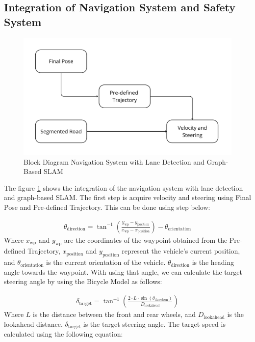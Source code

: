\documentclass[conference]{IEEEtran}
\begin{document}
\subsection{Integration of Navigation System and Safety System}
\begin{figure}[H]
	\centering
	\includegraphics[width=\linewidth]{../konten/nav_sysss.png}
	\caption{Block Diagram Navigation System with Lane Detection and Graph-Based SLAM}
	\label{fig:nav_new_system}
\end{figure} 

The figure \ref{fig:nav_new_system} shows the integration of the navigation system with lane detection and graph-based SLAM. The first step is acquire velocity and steering using Final Pose and Pre-defined Trajectory. This can be done using step below: 

\begin{equation}
	\begin{aligned}
	\theta_{\text{direction}} = \tan^{-1}\left(\frac{y_{\text{wp}} - y_{\text{position}}}{x_{\text{wp}} - x_{\text{position}}}\right) - \theta_{\text{orientation}}
	\label{eq:waypoint_angle}
	\end{aligned}
\end{equation}
Where $x_{\text{wp}}$ and $y_{\text{wp}}$ are the coordinates of the waypoint obtained from the Pre-defined Trajectory, $x_{\text{position}}$ and $y_{\text{position}}$ represent the vehicle's current position, and $\theta_{\text{orientation}}$ is the current orientation of the vehicle. $\theta_{\text{direction}}$ is the heading angle towards the waypoint. With using that angle, we can calculate the target steering angle by using the Bicycle Model as follows:

\begin{equation}
	\begin{aligned}
	\delta_{\text{target}} = \tan^{-1}\left( \frac{2 \cdot L \cdot \sin(\theta_{\text{direction}})}{D_{\text{lookahead}}} \right)
	\label{eq:bicycle_model_full}
	\end{aligned}
\end{equation}
Where $L$ is the distance between the front and rear wheels, and $D_{\text{lookahead}}$ is the lookahead distance. $\delta_{\text{target}}$ is the target steering angle. The target speed is calculated using the following equation:
\end{document}
